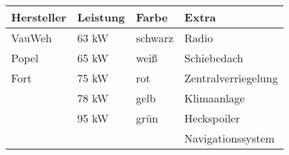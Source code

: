 \setlength{\extrarowheight}{2pt}

\begin{tabular}{|l|l|l|l|}
\rowcolor{heading}\color{white}\textbf{Hersteller} &
\color{white}\textbf{Leistung} &
\color{white}\textbf{Farbe} &	
\color{white}\textbf{Extra}\\
\hline
VauWeh & 63 kW & schwarz & Radio\\
Popel & 65 kW & weiß & Schiebedach\\
Fort & 75 kW & rot & Zentralverriegelung\\
& 78 kW & gelb & Klimaanlage \\
& 95 kW & grün & Heckspoiler\\
& & & Navigationssystem\\
\hline
\end{tabular}
